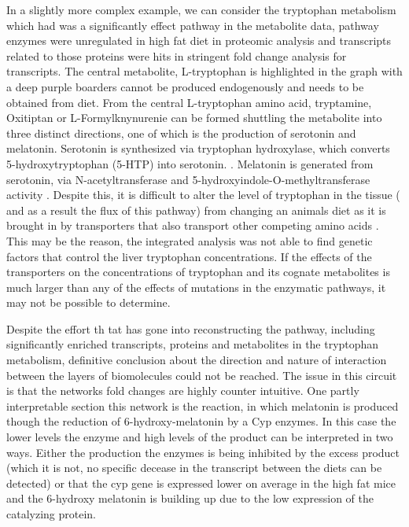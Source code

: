 \documentclass[a4paper,11pt,twoside]{book}
\begin{document}
	
	In a slightly more complex example, we can consider the tryptophan metabolism which had was a significantly effect pathway in the metabolite data, pathway enzymes were unregulated in high fat diet in proteomic analysis and transcripts related to those proteins were hits in stringent fold change analysis for transcripts. The central metabolite, L-tryptophan is highlighted in the graph with a deep purple boarders cannot be produced endogenously and needs to be obtained from diet. From the central L-tryptophan amino acid, tryptamine, Oxitiptan or L-Formylknynurenie can be formed shuttling the metabolite into three distinct directions, one of which is the production of serotonin and melatonin. Serotonin is synthesized via tryptophan hydroxylase, which converts 5-hydroxytryptophan (5-HTP) into serotonin. \citep{Schaechter1990,Fernstrom1983} . Melatonin is generated from serotonin, via N-acetyltransferase and 5-hydroxyindole-O-methyltransferase activity \citep{WURTMAN1969}. Despite this, it is difficult to alter the level of tryptophan in the tissue ( and as a result the flux of this pathway) from changing an animals diet as it is brought in by transporters that also transport other competing amino acids \citep{Robinson2009}. This may be the reason, the integrated analysis was not able to find genetic factors that control the liver tryptophan concentrations. If the effects of the transporters on the concentrations of tryptophan and its cognate metabolites is much larger than any of the effects of mutations in the enzymatic pathways, it may not be possible to determine.
	
	 Despite the effort th tat has gone into reconstructing the pathway, including  significantly enriched transcripts, proteins and metabolites in the tryptophan metabolism, definitive conclusion about the direction and nature of interaction between the layers of biomolecules could not be reached. The issue in this circuit is that the networks fold changes are highly counter intuitive. One partly interpretable section this network is the reaction, in which melatonin is produced though the reduction of 6-hydroxy-melatonin by a Cyp enzymes. In this case the lower levels the enzyme and  high levels of the product can be interpreted in two ways. Either the production the enzymes is being inhibited by the excess product (which it is not, no specific decease in the transcript between the diets can be detected) or that the cyp gene is expressed lower on average in the high fat mice and the 6-hydroxy melatonin is building up due to the low expression of the catalyzing protein.
	 
\end{document}
